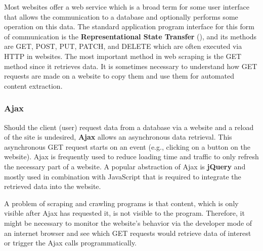 Most websites offer a web service which is a broad term for some user interface that allows the communication to a database and optionally performs some operation on this data. The standard application program interface for this form of communication is the \textbf{Representational State Transfer} (), and its methods are GET, POST, PUT, PATCH, and DELETE which are often executed via HTTP in websites. The most important method in web scraping is the GET method since it retrieves data. It is sometimes necessary to understand how GET requests are made on a website to copy them and use them for automated content extraction.

\subsubsection{Ajax}

Should the client (user) request data from a database via a website and a reload of the site is undesired, \textbf{Ajax} allows an asynchronous data retrieval. This asynchronous GET request starts on an event (e.g., clicking on a button on the website). Ajax is frequently used to reduce loading time and traffic to only refresh the necessary part of a website. A popular abstraction of Ajax is \textbf{jQuery} and mostly used in combination with JavaScript that is required to integrate the retrieved data into the website.

A problem of scraping and crawling programs is that content, which is only visible after Ajax has requested it, is not visible to the program. Therefore, it might be necessary to monitor the website's behavior via the developer mode of an internet browser and see which GET requests would retrieve data of interest or trigger the Ajax calls programmatically.
